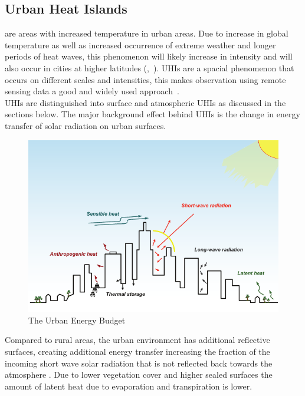 \documentclass[12pt,a4paper, english,twoside]{scrartcl}
\begin{document}
  \subsection{Urban Heat Islands}\label{sec:uhi}
     are areas with increased temperature in urban areas.
    Due to increase in global temperature as well as increased occurrence of extreme weather and longer periods of heat waves, this phenomenon will likely increase in intensity and will also occur in cities at higher latitudes (\cite{Sachindra2016},~\cite[p.~904]{Wilby2008}).
    \glspl{UHI} are a spacial phenomenon that occurs on different scales and intensities, this makes observation using remote sensing data a good and widely used approach~\autocite{Weng2003}.\\
    \glspl{UHI} are distinguished into surface and atmospheric \glspl{UHI} as discussed in the sections below. 
    The major background effect behind \glspl{UHI} is the change in energy transfer of solar radiation on urban surfaces. 
    \begin{figure}[htbp]
      \begin{center}
        \includegraphics[width=\textwidth]{img/radiationBudget.png}
      \end{center}
      \caption{The Urban Energy Budget~\autocite[Fig. 7, Reprinted from]{EPA2008}\label{fig:radiationbudget}}
    \end{figure}
    Compared to rural areas, the urban environment has additional reflective surfaces, creating additional energy transfer increasing the fraction of the incoming short wave solar radiation that is not reflected back towards the atmosphere \autocite[p.12]{EPA2008}. 
    Due to lower vegetation cover and higher sealed surfaces the amount of latent heat due to evaporation and transpiration is lower.
\end{document}
